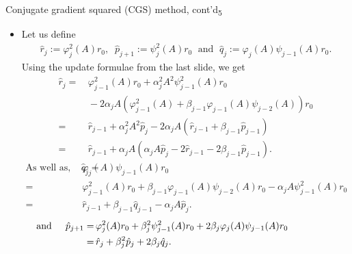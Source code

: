 \documentclass[t,usepdftitle=false]{beamer}
\begin{document}
\begin{frame}{Conjugate gradient squared (CGS) method, cont'd\textsubscript{5}}
\begin{itemize}
\item Let us define
\begin{align*}
\hat{r}_j:=\varphi_j^2(A)r_0,\;\;
\hat{p}_{j+1}:=\psi_j^2(A)r_0
\;\text{ and }\;
\hat{q}_j:=\varphi_j(A)\psi_{j-1}(A)r_0.
\end{align*}
Using the update formulae from the last slide, we get
\begin{align*}
\hat{r}_j
=&\,\varphi_{j-1}^2(A)r_0+\alpha_j^2A^2\psi^2_{j-1}(A)r_0\\
&\,-2\alpha_jA\left(\varphi_{j-1}^2(A)+\beta_{j-1}\varphi_{j-1}(A)\psi_{j-2}(A)\right)r_0\\
=&\,\hat{r}_{j-1}+\alpha_j^2A^2\hat{p}_j-2\alpha_jA\left(\hat{r}_{j-1}+\beta_{j-1}\hat{p}_{j-1}\right)\\
=&\,\hat{r}_{j-1}+\alpha_jA\left(\alpha_jA\hat{p}_j-2\hat{r}_{j-1}-2\beta_{j-1}\hat{p}_{j-1}\right).
\end{align*}
\begin{align*}
\text{As well as,}\;\;\;\;
\hat{q}_j
=&\,\varphi_j(A)\psi_{j-1}(A)r_0\\
=&\,\varphi_{j-1}^2(A)r_0+\beta_{j-1}\varphi_{j-1}(A)\psi_{j-2}(A)r_0-\alpha_{j}A\psi_{j-1}^2(A)r_0\\
=&\,\hat{r}_{j-1}+\beta_{j-1}\hat{q}_{j-1}-\alpha_{j}A\hat{p}_j.
\end{align*}
\begin{align*}
\hspace{-1.75cm}
\text{and }\;\;\;\;
\hat{p}_{j+1}
=&\,\varphi_j^2(A)r_0+\beta_j^2\psi_{j-1}^2(A)r_0+2\beta_j\varphi_j(A)\psi_{j-1}(A)r_0\\
=&\,\hat{r}_j+\beta_j^2\hat{p}_j+2\beta_j\hat{q}_j.
\end{align*}
\end{itemize}
\end{frame}
\end{document}

